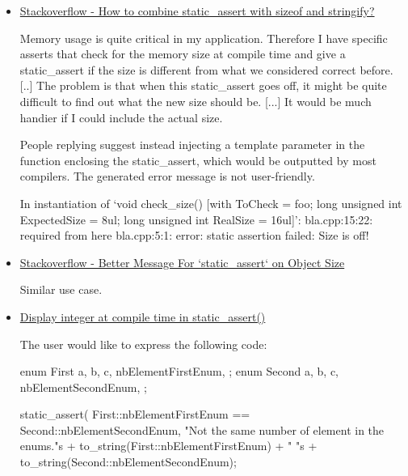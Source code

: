 \documentclass{wg21}
\begin{document}
\begin{itemize}
\item \href{https://stackoverflow.com/questions/11526526/how-to-combine-static-assert-with-sizeof-and-stringify}{Stackoverflow - How to combine static_assert with sizeof and stringify?}
\begin{quoteblock}
Memory usage is quite critical in my application. Therefore I have specific asserts that check for the memory size at compile time and give a static_assert if the size is different from what we considered correct before. [..] The problem is that when this static_assert goes off, it might be quite difficult to find out what the new size should be. [...] It would be much handier if I could include the actual size.
\end{quoteblock}

People replying suggest instead injecting a template parameter in the function enclosing the static_assert, which would be outputted by most compilers. The generated error message is not user-friendly.

\begin{quoteblock}
\begin{colorblock}
In instantiation of ‘void check_size() [with ToCheck = foo; long unsigned int ExpectedSize = 8ul; long unsigned int RealSize = 16ul]’:
bla.cpp:15:22:   required from here
bla.cpp:5:1: error: static assertion failed: Size is off!
\end{colorblock}
\end{quoteblock}

\item \href{https://stackoverflow.com/questions/11526526/how-to-combine-static-assert-with-sizeof-and-stringify}{Stackoverflow - Better Message For `static_assert` on Object Size}

Similar use case.

\item \href{https://stackoverflow.com/questions/13837668/display-integer-at-compile-time-in-static-assert}{Display integer at compile time in static_assert()}

The user would like to express the following code:

\begin{quoteblock}
\begin{colorblock}
enum First
{
    a,
    b,
    c,
    nbElementFirstEnum,
};
enum Second
{
    a,
    b,
    c,
    nbElementSecondEnum,
};

static_assert(
First::nbElementFirstEnum == Second::nbElementSecondEnum,
"Not the same number of element in the enums."s + to_string(First::nbElementFirstEnum) + " "s + to_string(Second::nbElementSecondEnum);
\end{colorblock}
\end{quoteblock}


\end{itemize}
\end{document}
